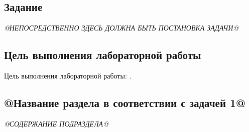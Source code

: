 \subsection*{Задание}\label{blockN.VariantM}

\textit{@НЕПОСРЕДСТВЕННО ЗДЕСЬ ДОЛЖНА БЫТЬ ПОСТАНОВКА ЗАДАЧИ@}

\subsection*{Цель выполнения лабораторной работы}

Цель выполнения лабораторной работы: \GoalOfResearch.

\subsection{@Название раздела в соответствии с задачей 1@}

\textit{@СОДЕРЖАНИЕ ПОДРАЗДЕЛА@}

%
%
%
%
%



